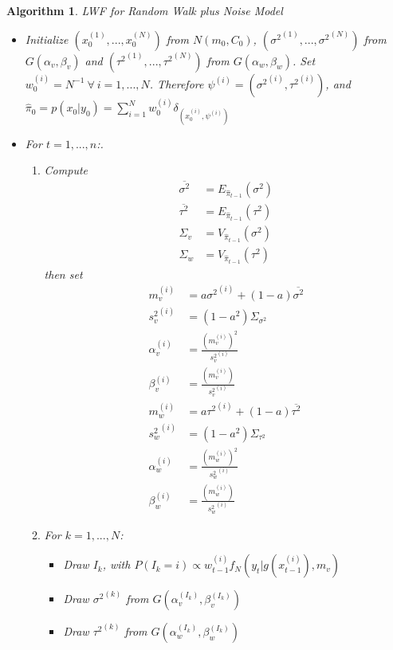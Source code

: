 \documentclass[
]{book}
\theoremstyle{break}
\theoremstyle{nonumberplain}
\newtheorem{algorithm}{Algorithm}[section]
\begin{document}
\begin{algorithm} LWF for Random Walk plus Noise Model
\begin{itemize}
\item Initialize $(x_{0}^{(1)},...,x_{0}^{(N)})$ from $N(m_{0},C_{0})$, $({\sigma^{2}}^{(1)},...,{\sigma^{2}}^{(N)})$ from $G(\alpha_{v},\beta_{v})$ and $({\tau^{2}}^{(1)},...,{\tau^{2}}^{(N)})$ from $G(\alpha_{w},\beta_{w})$. Set $w_{0}^{(i)}=N^{-1} \ \forall \ i=1,...,N$. Therefore $\psi^{(i)}=({\sigma^{2}}^{(i)},{\tau^{2}}^{(i)})$, and
$\hat{\pi}_{0}=p(x_{0}|y_{0})=\sum_{i=1}^{N}w_{0}^{(i)}\delta_{(x_{0}^{(i)},\psi^{(i)})}$
\item For $t=1,...,n$:.
\begin{enumerate}
\item Compute
\begin{align*}
\overline{\sigma^{2}}& =E_{\hat{\pi}_{t-1}}(\sigma^{2})\\
\overline{\tau^{2}}& =E_{\hat{\pi}_{t-1}}(\tau^{2}) \\
\Sigma_{v} & =V_{\hat{\pi}_{t-1}}(\sigma^{2}) \\
\Sigma_{w} & =V_{\hat{\pi}_{t-1}}(\tau^{2})
\end{align*}
then set
\begin{align*}
m_{v}^{(i)} & = a{\sigma^{2}}^{(i)}+(1-a)\overline{\sigma^{2}} \\
{s_{v}^{2}}^{(i)} & =(1-a^{2})\Sigma_{\sigma^{2}} \\
\alpha_{v}^{(i)} & =\frac{(m_{v}^{(i)})^{2}}{{s_{v}^{2}}^{(i)}} \\
\beta_{v}^{(i)} & =\frac{(m_{v}^{(i)})}{{s_{v}^{2}}^{(i)}}\\
m_{w}^{(i)} & = a{\tau^{2}}^{(i)}+(1-a)\overline{\tau^{2}} \\
{s_{w}^{2}}^{(i)} & =(1-a^{2})\Sigma_{\tau^{2}}\\
\alpha_{w}^{(i)} & =\frac{(m_{w}^{(i)})^{2}}{{s_{w}^{2}}^{(i)}} \\
\beta_{w}^{(i)} & =\frac{(m_{w}^{(i)})}{{s_{w}^{2}}^{(i)}}
\end{align*}
\item For $k=1,...,N$:
\begin{itemize}
\item Draw $I_{k}$, with $P(I_{k}=i) \propto w_{t-1}^{(i)}f_{N}(y_{t}|g(x_{t-1}^{(i)}),m_{v}) $
\item Draw ${\sigma^{2}}^{(k)}$ from $G(\alpha_{v}^{(I_k)},\beta_{v}^{(I_k)})$ 
\item Draw ${\tau^{2}}^{(k)}$ from $G(\alpha_{w}^{(I_k)},\beta_{w}^{(I_k)})$

\end{itemize}
\end{enumerate}
\end{itemize}
\end{algorithm}
\end{document}
